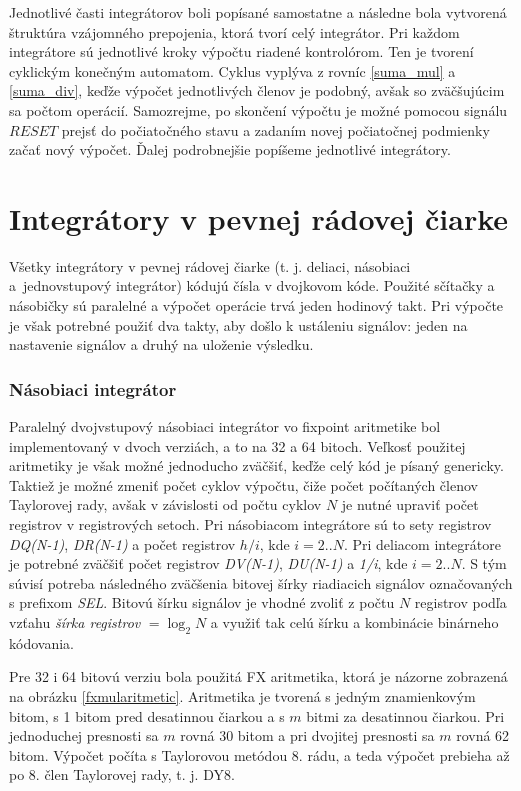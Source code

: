 Jednotlivé časti integrátorov boli popísané samostatne a následne bola vytvorená štruktúra vzájomného prepojenia, ktorá tvorí celý integrátor. Pri každom integrátore sú jednotlivé kroky výpočtu riadené kontrolórom. Ten je tvorení cyklickým konečným automatom. Cyklus vyplýva z rovníc \eqref{suma_mul} a \eqref{suma_div}, keďže výpočet jednotlivých členov je podobný, avšak so zväčšujúcim sa počtom operácií. Samozrejme, po skončení výpočtu je možné pomocou signálu $ RESET $ prejsť do počiatočného stavu a zadaním novej počiatočnej podmienky začať nový výpočet. Ďalej podrobnejšie popíšeme jednotlivé integrátory.

\section{Integrátory v pevnej rádovej čiarke}
Všetky integrátory v pevnej rádovej čiarke (t. j. deliaci, násobiaci a jednovstupový integrátor) kódujú čísla v dvojkovom kóde. Použité sčítačky a násobičky sú paralelné a výpočet operácie trvá jeden hodinový takt. Pri výpočte je však potrebné použiť dva takty, aby došlo k ustáleniu signálov: jeden na nastavenie signálov a druhý na uloženie výsledku.

\subsubsection*{Násobiaci integrátor}

Paralelný dvojvstupový násobiaci integrátor vo fixpoint aritmetike bol implementovaný v dvoch verziách, a to na 32 a 64 bitoch. Veľkosť použitej aritmetiky je však možné jednoducho zväčšiť, keďže celý kód je písaný genericky. Taktiež je možné zmeniť počet cyklov výpočtu, čiže počet počítaných členov Taylorovej rady, avšak v závislosti od počtu cyklov $ N $ je nutné upraviť počet registrov v registrových setoch. Pri násobiacom integrátore sú to sety registrov \textit{DQ(N-1)}, \textit{DR(N-1)} a počet registrov $ h/i $, kde $ i = 2..N $. Pri deliacom integrátore je potrebné zväčšiť počet registrov \textit{DV(N-1)}, \textit{DU(N-1)} a \textit{1/i}, kde $ i = 2..N $. S tým súvisí potreba následného zväčšenia bitovej šírky riadiacich signálov označovaných s prefixom \textit{SEL}. Bitovú šírku signálov je vhodné zvoliť z počtu $ N $ registrov podľa vzťahu \textit{šírka registrov} $ = \log_{2} N $ a využiť tak celú šírku a kombinácie binárneho kódovania.

Pre 32 i 64 bitovú verziu bola použitá FX aritmetika, ktorá je názorne zobrazená na obrázku \ref{fxmularitmetic}. Aritmetika je tvorená s jedným znamienkovým bitom, s 1 bitom pred desatinnou čiarkou a s $ m $ bitmi za desatinnou čiarkou. Pri jednoduchej presnosti sa $ m $ rovná 30 bitom a pri dvojitej presnosti sa $ m $ rovná 62 bitom. Výpočet počíta s Taylorovou metódou 8. rádu, a teda výpočet prebieha až po 8. člen Taylorovej rady, t. j. DY8.

